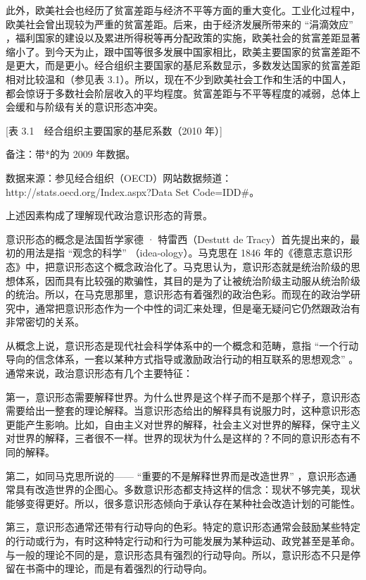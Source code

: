 此外，欧美社会也经历了贫富差距与经济不平等方面的重大变化。工业化过程中，欧美社会曾出现较为严重的贫富差距。后来，由于经济发展所带来的 “涓滴效应” ，福利国家的建设以及累进所得税等再分配政策的实施，欧美社会的贫富差距显著缩小了。到今天为止，跟中国等很多发展中国家相比，欧美主要国家的贫富差距不是更大，而是更小。经合组织主要国家的基尼系数显示，多数发达国家的贫富差距相对比较温和（参见表 3.1）。所以，现在不少到欧美社会工作和生活的中国人，都会惊讶于多数社会阶层收入的平均程度。贫富差距与不平等程度的减弱，总体上会缓和与阶级有关的意识形态冲突。

[表 3.1　经合组织主要国家的基尼系数（2010 年）]

备注：带*的为 2009 年数据。

数据来源：参见经合组织（OECD）网站数据频道：http://stats.oecd.org/Index.aspx?Data Set Code=IDD\#。

上述因素构成了理解现代政治意识形态的背景。

意识形态的概念是法国哲学家德 · 特雷西（Destutt de Tracy）首先提出来的，最初的用法是指 “观念的科学” （idea-ology）。马克思在 1846 年的《德意志意识形态》中，把意识形态这个概念政治化了。马克思认为，意识形态就是统治阶级的思想体系，因而具有比较强的欺骗性，其目的是为了让被统治阶级主动服从统治阶级的统治。所以，在马克思那里，意识形态有着强烈的政治色彩。而现在的政治学研究中，通常把意识形态作为一个中性的词汇来处理，但是毫无疑问它仍然跟政治有非常密切的关系。

从概念上说，意识形态是现代社会科学体系中的一个概念和范畴，意指 “一个行动导向的信念体系，一套以某种方式指导或激励政治行动的相互联系的思想观念” 。通常来说，政治意识形态有几个主要特征：

第一，意识形态需要解释世界。为什么世界是这个样子而不是那个样子，意识形态需要给出一整套的理论解释。当意识形态给出的解释具有说服力时，这种意识形态更能产生影响。比如，自由主义对世界的解释，社会主义对世界的解释，保守主义对世界的解释，三者很不一样。世界的现状为什么是这样的？不同的意识形态有不同的解释。

第二，如同马克思所说的—— “重要的不是解释世界而是改造世界” ，意识形态通常具有改造世界的企图心。多数意识形态都支持这样的信念：现状不够完美，现状能够变得更好。所以，很多意识形态倾向于承认存在某种社会改造计划的可能性。

第三，意识形态通常还带有行动导向的色彩。特定的意识形态通常会鼓励某些特定的行动或行为，有时这种特定行动和行为可能发展为某种运动、政党甚至是革命。与一般的理论不同的是，意识形态具有强烈的行动导向。所以，意识形态不只是停留在书斋中的理论，而是有着强烈的行动导向。

